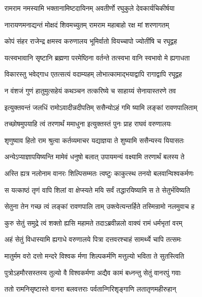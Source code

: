 \twolineshloka
{रामराम नमस्यामि भक्तानामिष्टदायिनम्}
{अवतीर्णो रघुकुले देवकार्यचिकीर्षया}%

\twolineshloka
{नारायणमनाद्यन्तं मोक्षदं शिवमच्युतम्}
{रामराम महाबाहो रक्ष मां शरणागतम्}%

\twolineshloka
{कोपं संहर राजेन्द्र क्षमस्व करुणालय}
{भूमिर्वातो वियच्चापो ज्योतींषि च रघूद्वह}%

\twolineshloka
{यत्स्वभावानि सृष्टानि ब्रह्मणा परमेष्ठिना}
{वर्तन्ते तत्स्वभा वानि स्वभावो मे ह्यगाधता}%

\twolineshloka
{विकारस्तु भवेद्गाध एतत्सत्यं वदाम्यहम्}
{लोभात्कामाद्भयाद्वापि रागाद्वापि रघूद्वह}%

\twolineshloka
{न वंशजं गुणं हातुमुत्सहेयं कथञ्चन}
{तत्करिष्ये च साहाय्यं सेनायास्तरणे तव}%

\twolineshloka
{इत्युक्तवन्तं जलधिं रामोऽवादीन्नदीपतिम्}
{ससैन्योऽहं गमि ष्यामि लङ्कां रावणपालिताम्}%

\twolineshloka
{तच्छोषमुपयाहि त्वं तरणार्थं ममाधुना}
{इत्युक्तस्तं पुनः प्राह राघवं वरुणालयः}%

\twolineshloka
{शृणुष्वाव हितो राम श्रुत्वा कर्तव्यमाचर}
{यद्याज्ञया ते शुष्यामि ससैन्यस्य यियासतः}%

\twolineshloka
{अन्येऽप्याज्ञापयिष्यन्ति मामेवं धनुषो बलात्}
{उपायमन्यं वक्ष्यामि तरणार्थं बलस्य ते}%

\twolineshloka
{अस्ति ह्यत्र नलोनाम वानरः शिल्पिसम्मतः}
{त्वष्टुः काकुत्स्थ तनयो बलवान्विश्वकर्मणः}%

\twolineshloka
{स यत्काष्ठं तृणं वापि शिलां वा क्षेप्स्यते मयि}
{सर्वं तद्धारयिष्यामि स ते सेतुर्भविष्यति}%

\twolineshloka
{सेतुना तेन गच्छ त्वं लङ्कां रावणपालि ताम्}
{उक्त्वेत्यन्तर्हिते तस्मिन्रामो नलमुवाच ह}%

\twolineshloka
{कुरु सेतुं समुद्रे त्वं शक्तो ह्यसि महामते}
{तदाऽब्रवीन्नलो वाक्यं रामं धर्मभृतां वरम्}%

\twolineshloka
{अहं सेतुं विधास्यामि ह्यगाधे वरुणालये}
{पित्रा दत्तवरश्चाहं सामर्थ्ये चापि तत्समः}%

\twolineshloka
{मातुर्मम वरो दत्तो मन्दरे विश्वक र्मणा}
{शिल्पकर्मणि मत्तुल्यो भविता ते सुतस्त्विति}%

\twolineshloka
{पुत्रोऽहमौरसस्तस्य तुल्यो वै विश्वकर्मणा}
{अद्यैव कामं बध्नन्तु सेतुं वानरपुं गवाः}%

\twolineshloka
{ततो रामनिसृष्टास्ते वानरा बलवत्तराः}
{पर्वतान्गिरिशृङ्गाणि लतातृणमहीरुहान्}%

